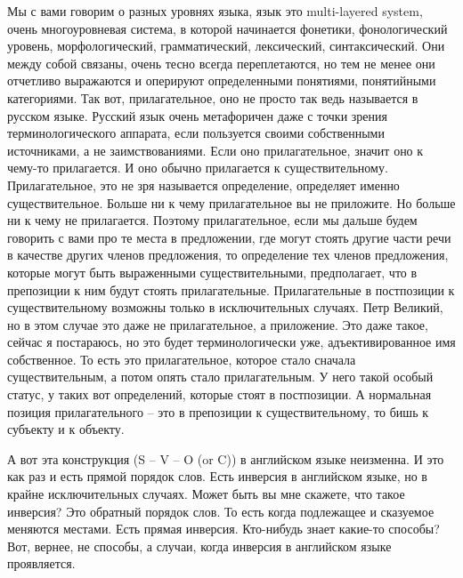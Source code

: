 \documentclass[main.tex]{subfiles}
\begin{document}
Мы с вами говорим о разных уровнях языка, язык это multi-layered system, очень многоуровневая система, в которой начинается фонетики, фонологический уровень, морфологический, грамматический, лексический, синтаксический.
Они между собой связаны, очень тесно всегда переплетаются, но тем не менее они отчетливо выражаются и оперируют определенными понятиями, понятийными категориями.
Так вот, прилагательное, оно не просто так ведь называется в русском языке.
Русский язык очень метафоричен даже с точки зрения терминологического аппарата, если пользуется своими собственными источниками, а не заимствованиями.
Если оно прилагательное, значит оно к чему-то прилагается.
И оно обычно прилагается к существительному.
Прилагательное, это не зря называется определение, определяет именно существительное.
Больше ни к чему прилагательное вы не приложите.
Но больше ни к чему не прилагается.
Поэтому прилагательное, если мы дальше будем говорить с вами про те места в предложении, где могут стоять другие части речи в качестве других членов предложения, то определение тех членов предложения, которые могут быть выраженными существительными, предполагает, что в препозиции к ним будут стоять прилагательные.
Прилагательные в постпозиции к существительному возможны только в исключительных случаях.
Петр Великий, но в этом случае это даже не прилагательное, а приложение.
Это даже такое, сейчас я постараюсь, но это будет терминологически уже, адъективированное имя собственное.
То есть это прилагательное, которое стало сначала существительным, а потом опять стало прилагательным.
У него такой особый статус, у таких вот определений, которые стоят в постпозиции.
А нормальная позиция прилагательного -- это в препозиции к существительному, то бишь к субъекту и к объекту.

А вот эта конструкция (S -- V -- O (or C)) в английском языке неизменна.
И это как раз и есть прямой порядок слов.
Есть инверсия в английском языке, но в крайне исключительных случаях.
Может быть вы мне скажете, что такое инверсия?
Это обратный порядок слов.
То есть когда подлежащее и сказуемое меняются местами.
Есть прямая инверсия.
Кто-нибудь знает какие-то способы?
Вот, вернее, не способы, а случаи, когда инверсия в английском языке проявляется.
\end{document}
